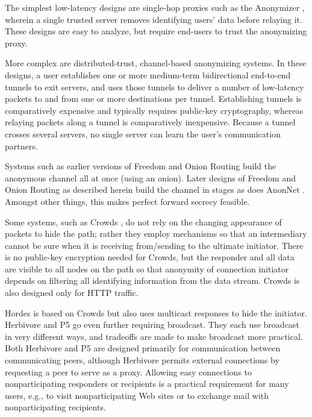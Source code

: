 \documentclass[times,10pt,twocolumn]{article}
\begin{document}
The simplest low-latency designs are single-hop proxies such as the
Anonymizer \cite{anonymizer}, wherein a single trusted server removes
identifying users' data before relaying it.  These designs are easy to
analyze, but require end-users to trust the anonymizing proxy.

More complex are distributed-trust, channel-based anonymizing systems.  In
these designs, a user establishes one or more medium-term bidirectional
end-to-end tunnels to exit servers, and uses those tunnels to deliver a
number of low-latency packets to and from one or more destinations per
tunnel.  Establishing tunnels is comparatively expensive and typically
requires public-key cryptography, whereas relaying packets along a tunnel is
comparatively inexpensive.  Because a tunnel crosses several servers, no
single server can learn the user's communication partners.

Systems such as earlier versions of Freedom and Onion Routing
build the anonymous channel all at once (using an onion). Later
designs of Freedom and Onion Routing as described herein build
the channel in stages as does AnonNet
\cite{anonnet}. Amongst other things, this makes perfect forward
secrecy feasible.

Some systems, such as Crowds \cite{crowds-tissec}, do not rely on the
changing appearance of packets to hide the path; rather they employ
mechanisms so that an intermediary cannot be sure when it is
receiving from/sending to the ultimate initiator. There is no public-key
encryption needed for Crowds, but the responder and all data are
visible to all nodes on the path so that anonymity of connection
initiator depends on filtering all identifying information from the
data stream. Crowds is also designed only for HTTP traffic.

Hordes \cite{hordes-jcs} is based on Crowds but also uses multicast
responses to hide the initiator. Herbivore \cite{herbivore} and
P5 \cite{p5} go even further requiring broadcast.
They each use broadcast in very different ways, and tradeoffs are made to
make broadcast more practical. Both Herbivore and P5 are designed primarily
for communication between communicating peers, although Herbivore
permits external connections by requesting a peer to serve as a proxy.
Allowing easy connections to nonparticipating responders or recipients
is a practical requirement for many users, e.g., to visit
nonparticipating Web sites or to exchange mail with nonparticipating
recipients.
\end{document}
